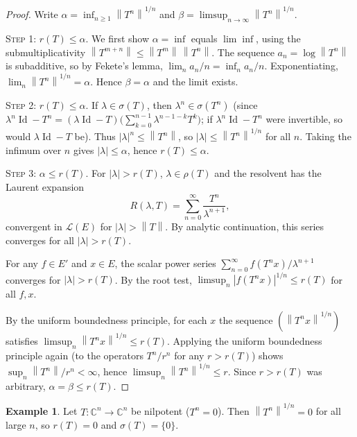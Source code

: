 \documentclass[a4paper,12pt]{book}
\DeclareMathOperator{\Id}{Id}
\newcommand{\C}{\mathbb{C}}
\newcommand{\norm}[1]{\left\| #1 \right\|}
\newcommand{\abs}[1]{\left| #1 \right|}
\theoremstyle{definition}
\newtheorem{example}[definition]{Example}
\theoremstyle{plain}
\theoremstyle{remark}
\begin{document}
\begin{proof}
Write $\alpha = \inf_{n\geq 1}\norm{T^n}^{1/n}$ and
$\beta = \limsup_{n\to\infty}\norm{T^n}^{1/n}$.

\textsc{Step 1: $r(T)\leq\alpha$.}
We first show $\alpha=\inf$ equals $\lim\inf$, using the submultiplicativity
$\norm{T^{m+n}}\leq\norm{T^m}\,\norm{T^n}$. The sequence $a_n = \log\norm{T^n}$
is subadditive, so by Fekete's lemma,
$\lim_{n}a_n/n = \inf_n a_n/n$. Exponentiating, $\lim_n\norm{T^n}^{1/n}=\alpha$.
Hence $\beta = \alpha$ and the limit exists.

\textsc{Step 2: $r(T)\leq\alpha$.}
If $\lambda\in\sigma(T)$, then $\lambda^n\in\sigma(T^n)$ (since
$\lambda^n\Id - T^n = (\lambda\Id-T)\bigl(\sum_{k=0}^{n-1}\lambda^{n-1-k}T^k\bigr)$;
if $\lambda^n\Id-T^n$ were invertible, so would $\lambda\Id-T$ be). Thus
$\abs{\lambda}^n\leq\norm{T^n}$, so $\abs{\lambda}\leq\norm{T^n}^{1/n}$ for
all $n$. Taking the infimum over $n$ gives $\abs{\lambda}\leq\alpha$, hence
$r(T)\leq\alpha$.

\textsc{Step 3: $\alpha\leq r(T)$.}
For $\abs{\lambda}>r(T)$, $\lambda\in\rho(T)$ and the resolvent has the Laurent
expansion
\[
  R(\lambda,T) = \sum_{n=0}^{\infty}\frac{T^n}{\lambda^{n+1}},
\]
convergent in $\mathcal{L}(E)$ for $\abs{\lambda}>\norm{T}$. By analytic
continuation, this series converges for all
$\abs{\lambda}>r(T)$.

For any $f\in E'$ and $x\in E$, the scalar power series
$\sum_{n=0}^{\infty}f(T^n x)/\lambda^{n+1}$ converges for $\abs{\lambda}>r(T)$.
By the root test, $\limsup_n\abs{f(T^n x)}^{1/n}\leq r(T)$ for all $f,x$.

By the uniform boundedness principle, for
each $x$ the sequence $(\norm{T^n x}^{1/n})$ satisfies
$\limsup_n\norm{T^n x}^{1/n}\leq r(T)$. Applying the uniform boundedness
principle again (to the operators $T^n/r^n$ for any $r>r(T)$) shows
$\sup_n\norm{T^n}/r^n<\infty$, hence $\limsup_n\norm{T^n}^{1/n}\leq r$.
Since $r>r(T)$ was arbitrary, $\alpha = \beta\leq r(T)$.
\end{proof}

\begin{example}\label{ex:spectral-radius-nilpotent}
Let $T\colon\C^n\to\C^n$ be nilpotent ($T^n=0$). Then $\norm{T^n}^{1/n}=0$ for
all large $n$, so $r(T)=0$ and $\sigma(T)=\{0\}$.
\end{example}
\end{document}
